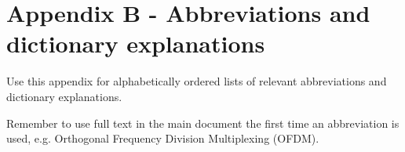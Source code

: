 \section{Appendix B - Abbreviations and dictionary explanations}
Use this appendix for alphabetically ordered lists of relevant abbreviations and dictionary explanations.

Remember to use full text in the main document the first time an abbreviation is used, e.g. Orthogonal Frequency Division Multiplexing (OFDM).

\begin{acronym}
\end{acronym}

\pagebreak